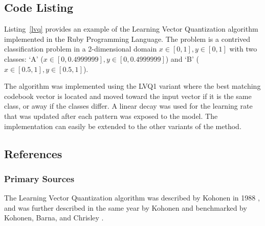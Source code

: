 \subsection{Code Listing}
Listing~\ref{lvq} provides an example of the Learning Vector Quantization algorithm implemented in the Ruby Programming Language. 
The problem is a contrived classification problem in a 2-dimensional domain $x\in[0,1], y\in[0,1]$ with two classes: `A' ($x\in[0,0.4999999], y\in[0,0.4999999]$) and `B' ($x\in[0.5,1], y\in[0.5,1]$).

The algorithm was implemented using the LVQ1 variant where the best matching codebook vector is located and moved toward the input vector if it is the same class, or away if the classes differ. A linear decay was used for the learning rate that was updated after each pattern was exposed to the model. The implementation can easily be extended to the other variants of the method.



\subsection{References}

% 
% 
\subsubsection{Primary Sources}
The Learning Vector Quantization algorithm was described by Kohonen in 1988 \cite{Kohonen1988}, and was further described in the same year by Kohonen \cite{Kohonen1988a} and benchmarked by Kohonen, Barna, and Chrisley \cite{Kohonen1988b}.

